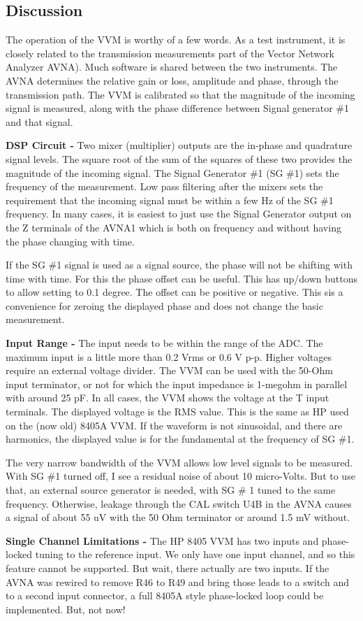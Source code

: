 \subsection{Discussion}
\label{subsect:VVMDiscus}
The operation of the VVM is worthy of a few words. As a test instrument, it is closely related to the transmission measurements part of the Vector Network Analyzer AVNA). Much software is shared between the two instruments. The AVNA determines the relative gain or loss, amplitude and phase, through the transmission path. The VVM is calibrated so that the magnitude of the incoming signal is measured, along with the phase difference between Signal generator \#1 and that signal.

\textbf{DSP Circuit - }Two mixer (multiplier) outputs are the in-phase and quadrature signal levels. The square root of the sum of the squares of these two provides the magnitude of the incoming signal. The Signal Generator \#1 (SG \#1) sets the frequency of the measurement. Low pass filtering after the mixers sets the requirement that the incoming signal must be within a few Hz of the SG \#1 frequency. In many cases, it is easiest to just use the Signal Generator output on the Z terminals of the AVNA1 which is both on frequency and without having the phase changing with time.

If the SG \#1 signal is used as a signal source, the phase will not be shifting with time with time. For this the phase offset can be useful. This has up/down buttons to allow setting to 0.1 degree. The offset can be positive or negative. This sis a convenience for zeroing the displayed phase and does not change the basic measurement.

\textbf{Input Range - }The input needs to be within the range of the ADC. The maximum input is a little more than 0.2 Vrms or 0.6 V p-p.  Higher voltages require an external voltage divider.  The VVM can be used with the 50-Ohm input terminator, or not for which the input impedance is 1-megohm in parallel with around 25 pF.  In all cases, the VVM shows the voltage at the T input terminals.  The displayed voltage is the RMS value.  This is the same as HP used on the (now  old) 8405A VVM.   If the waveform is not sinusoidal, and there are harmonics, the displayed value is for the fundamental at the frequency of SG \#1.

The very narrow bandwidth of the VVM allows low level signals to be measured.  With SG \#1 turned off, I see a residual noise of about 10 micro-Volts.  But to use that, an external source generator is needed, with SG \# 1 tuned to the same frequency.  Otherwise, leakage through the CAL switch U4B in the AVNA causes a signal of about 55 uV with the 50 Ohm terminator or around 1.5 mV without.

\textbf{Single Channel Limitations - }The HP 8405 VVM has two inputs and phase-locked tuning to the reference input.  We only have one input channel, and so this feature cannot be supported.  But wait, there actually are two inputs.  If the AVNA was rewired to remove R46 to R49 and bring those leads to a switch and to a second input connector, a full 8405A style phase-locked loop could be implemented.  But, not now!

